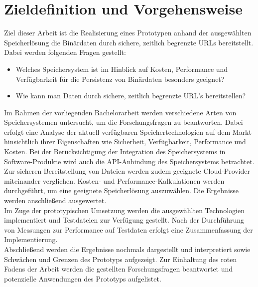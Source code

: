 \section{Zieldefinition und Vorgehensweise}

Ziel dieser Arbeit ist die Realisierung eines Prototypen anhand der ausgewählten Speicherlösung die Binärdaten durch sichere, zeitlich begrenzte URLs bereitstellt. Dabei werden folgenden Fragen gestellt:

\begin{itemize}
	\item Welches Speichersystem ist im Hinblick auf Kosten, Performance und Verfügbarkeit für die Persistenz von Binärdaten besonders geeignet? 
	\item Wie kann man Daten durch sichere, zeitlich begrenzte URL's bereitstellen?
\end{itemize}

Im Rahmen der vorliegenden Bachelorarbeit werden verschiedene Arten von Speichersystemen untersucht, um die Forschungsfragen zu beantworten. Dabei erfolgt eine Analyse der aktuell verfügbaren Speichertechnologien auf dem Markt hinsichtlich ihrer Eigenschaften wie Sicherheit, Verfügbarkeit, Performance und Kosten. Bei der Berücksichtigung der Integration des Speichersystems in Software-Produkte wird auch die API-Anbindung des Speichersystems betrachtet. Zur sicheren Bereitstellung von Dateien werden zudem geeignete Cloud-Provider miteinander verglichen. Kosten- und Performance-Kalkulationen werden durchgeführt, um eine geeignete Speicherlösung auszuwählen. Die Ergebnisse werden anschließend ausgewertet.\\

Im Zuge der prototypischen Umsetzung werden die ausgewählten Technologien implementiert und Testdateien zur Verfügung gestellt. Nach der Durchführung von Messungen zur Performance auf Testdaten erfolgt eine Zusammenfassung der Implementierung.\\

Abschließend werden die Ergebnisse nochmals dargestellt und interpretiert sowie Schwächen und Grenzen des Prototyps aufgezeigt. Zur Einhaltung des roten Fadens der Arbeit werden die gestellten Forschungsfragen beantwortet und potenzielle Anwendungen des Prototyps aufgelistet.

